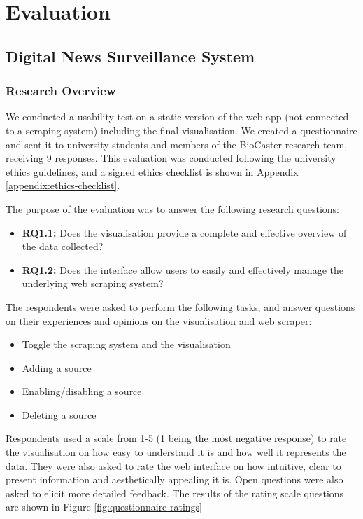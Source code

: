 \documentclass{l4proj}
\begin{document}
\chapter{Evaluation}

\section{Digital News Surveillance System}
\subsection{Research Overview}
We conducted a usability test on a static version of the web app (not connected to a scraping system) including the final visualisation. We created a questionnaire and sent it to university students and members of the BioCaster research team, receiving 9 responses. This evaluation was conducted following the university ethics guidelines, and a signed ethics checklist is shown in Appendix \ref{appendix:ethics-checklist}. \par
The purpose of the evaluation was to answer the following research questions:
\begin{itemize}
    \item \textbf{RQ1.1: } Does the visualisation provide a complete and effective overview of the data collected?
    \item \textbf{RQ1.2: }Does the interface allow users to easily and effectively manage the underlying web scraping system?
\end{itemize}

The respondents were asked to perform the following tasks, and answer questions on their experiences and opinions on the visualisation and web scraper:
\begin{itemize}
    \item Toggle the scraping system and the visualisation
    \item Adding a source
    \item Enabling/disabling a source
    \item Deleting a source
\end{itemize}

Respondents used a scale from 1-5 (1 being the most negative response) to rate the visualisation on how easy to understand it is and how well it represents the data. They were also asked to rate the web interface on how intuitive, clear to present information and aesthetically appealing it is. Open questions were also asked to elicit more detailed feedback. The results of the rating scale questions are shown in Figure \ref{fig:questionnaire-ratings}
\end{document}
